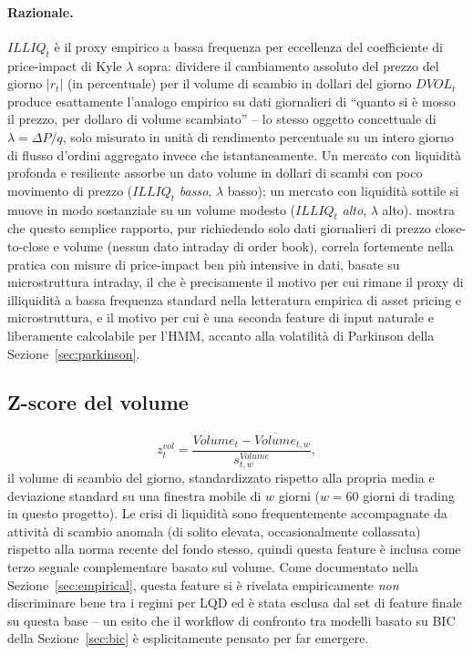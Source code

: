 \documentclass[11pt]{article}
\theoremstyle{definition}
\theoremstyle{remark}
\begin{document}
\paragraph{Razionale.} $ILLIQ_t$ \`e il proxy empirico a bassa frequenza per eccellenza del coefficiente di price-impact di Kyle $\lambda$ sopra: dividere il cambiamento assoluto del prezzo del giorno $|r_t|$ (in percentuale) per il volume di scambio in dollari del giorno $DVOL_t$ produce esattamente l'analogo empirico su dati giornalieri di ``quanto si \`e mosso il prezzo, per dollaro di volume scambiato'' -- lo stesso oggetto concettuale di $\lambda=\Delta P/q$, solo misurato in unit\`a di rendimento percentuale su un intero giorno di flusso d'ordini aggregato invece che istantaneamente. Un mercato con liquidit\`a profonda e resiliente assorbe un dato volume in dollari di scambi con poco movimento di prezzo ($ILLIQ_t$ \emph{basso}, $\lambda$ basso); un mercato con liquidit\`a sottile si muove in modo sostanziale su un volume modesto ($ILLIQ_t$ \emph{alto}, $\lambda$ alto). \cite{amihud2002} mostra che questo semplice rapporto, pur richiedendo solo dati giornalieri di prezzo close-to-close e volume (nessun dato intraday di order book), correla fortemente nella pratica con misure di price-impact ben pi\`u intensive in dati, basate su microstruttura intraday, il che \`e precisamente il motivo per cui rimane il proxy di illiquidit\`a a bassa frequenza standard nella letteratura empirica di asset pricing e microstruttura, e il motivo per cui \`e una seconda feature di input naturale e liberamente calcolabile per l'HMM, accanto alla volatilit\`a di Parkinson della Sezione~\ref{sec:parkinson}.

\subsection{Z-score del volume}
\label{sec:volz}

\[
z^{vol}_t = \frac{Volume_t-\overline{Volume}_{t,w}}{s^{Volume}_{t,w}},
\]
il volume di scambio del giorno, standardizzato rispetto alla propria media e deviazione standard su una finestra mobile di $w$ giorni ($w=60$ giorni di trading in questo progetto). Le crisi di liquidit\`a sono frequentemente accompagnate da attivit\`a di scambio anomala (di solito elevata, occasionalmente collassata) rispetto alla norma recente del fondo stesso, quindi questa feature \`e inclusa come terzo segnale complementare basato sul volume. Come documentato nella Sezione~\ref{sec:empirical}, questa feature si \`e rivelata empiricamente \emph{non} discriminare bene tra i regimi per LQD ed \`e stata esclusa dal set di feature finale su questa base -- un esito che il workflow di confronto tra modelli basato su BIC della Sezione~\ref{sec:bic} \`e esplicitamente pensato per far emergere.
\end{document}
